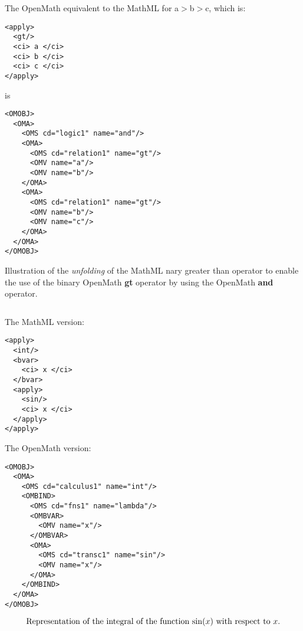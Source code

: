 \documentclass[twoside,11pt]{article}
\begin{document}
\begin{center}
\begin{mybox}{4.5in}
  
The OpenMath equivalent to the MathML for a$>$b$>$c, which is:
\begin{verbatim}
<apply>
  <gt/>
  <ci> a </ci>
  <ci> b </ci>
  <ci> c </ci>
</apply>
\end{verbatim}
is
\begin{verbatim}
<OMOBJ>
  <OMA>
    <OMS cd="logic1" name="and"/>
    <OMA>
      <OMS cd="relation1" name="gt"/>
      <OMV name="a"/>
      <OMV name="b"/>
    </OMA>
    <OMA>
      <OMS cd="relation1" name="gt"/>
      <OMV name="b"/>
      <OMV name="c"/>
    </OMA>
  </OMA>
</OMOBJ>

\end{verbatim}
\end{mybox}
\end{center}
\begin{center}
Illustration of the {\em unfolding} of the MathML nary greater than operator
to enable the use of the binary OpenMath {\bf gt} operator by using the
OpenMath {\bf and} operator.
\end{center}
\begin{equation}\label{gt-unfold}
\end{equation}

\begin{center}
\begin{mybox}{4.5in}
The MathML version:
\begin{verbatim}
<apply>
  <int/>
  <bvar>
    <ci> x </ci>
  </bvar>
  <apply>
    <sin/>
    <ci> x </ci>
  </apply>
</apply>
\end{verbatim}

The OpenMath version:
\begin{verbatim}
<OMOBJ>
  <OMA>
    <OMS cd="calculus1" name="int"/>
    <OMBIND>
      <OMS cd="fns1" name="lambda"/>
      <OMBVAR>
        <OMV name="x"/>
      </OMBVAR>
      <OMA>
        <OMS cd="transc1" name="sin"/>
        <OMV name="x"/>
      </OMA>
    </OMBIND>
  </OMA>
</OMOBJ>

\end{verbatim}
\end{mybox}
\end{center}
\begin{equation}\label{int}
\hbox{Representation of the integral of the function $\sin(x)$ with respect to $x$.}
\end{equation}
\end{document}
